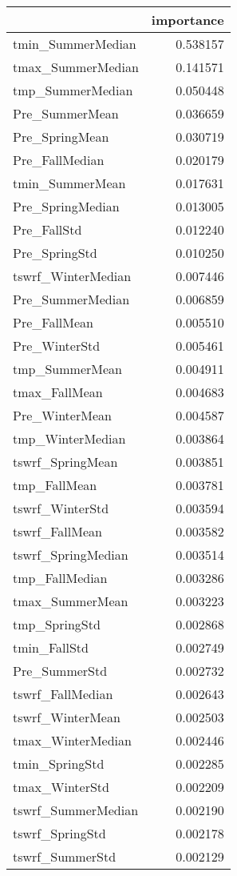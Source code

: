 \begin{tabular}{lr}
\toprule
 & importance \\
\midrule
tmin_SummerMedian & 0.538157 \\
tmax_SummerMedian & 0.141571 \\
tmp_SummerMedian & 0.050448 \\
Pre_SummerMean & 0.036659 \\
Pre_SpringMean & 0.030719 \\
Pre_FallMedian & 0.020179 \\
tmin_SummerMean & 0.017631 \\
Pre_SpringMedian & 0.013005 \\
Pre_FallStd & 0.012240 \\
Pre_SpringStd & 0.010250 \\
tswrf_WinterMedian & 0.007446 \\
Pre_SummerMedian & 0.006859 \\
Pre_FallMean & 0.005510 \\
Pre_WinterStd & 0.005461 \\
tmp_SummerMean & 0.004911 \\
tmax_FallMean & 0.004683 \\
Pre_WinterMean & 0.004587 \\
tmp_WinterMedian & 0.003864 \\
tswrf_SpringMean & 0.003851 \\
tmp_FallMean & 0.003781 \\
tswrf_WinterStd & 0.003594 \\
tswrf_FallMean & 0.003582 \\
tswrf_SpringMedian & 0.003514 \\
tmp_FallMedian & 0.003286 \\
tmax_SummerMean & 0.003223 \\
tmp_SpringStd & 0.002868 \\
tmin_FallStd & 0.002749 \\
Pre_SummerStd & 0.002732 \\
tswrf_FallMedian & 0.002643 \\
tswrf_WinterMean & 0.002503 \\
tmax_WinterMedian & 0.002446 \\
tmin_SpringStd & 0.002285 \\
tmax_WinterStd & 0.002209 \\
tswrf_SummerMedian & 0.002190 \\
tswrf_SpringStd & 0.002178 \\
tswrf_SummerStd & 0.002129 \\

\end{tabular}
